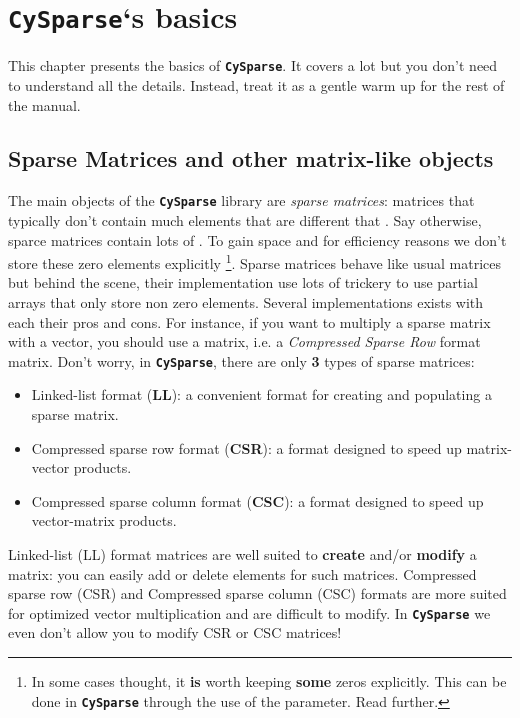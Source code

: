 \documentclass[letterpaper,10pt,english]{sphinxmanual}
\begin{document}
\chapter{\textbf{\texttt{CySparse}}`s basics}
\label{cysparse_basics:cysparse-s-basics}\label{cysparse_basics:cysparse-basics}\label{cysparse_basics::doc}
This chapter presents the basics of \textbf{\texttt{CySparse}}. It covers a lot but you don't need to understand all the details. Instead, treat it as a gentle warm up for the rest of the manual.


\section{Sparse Matrices and other matrix-like objects}
\label{cysparse_basics:sparse-matrices-and-other-matrix-like-objects}
The main objects of the \textbf{\texttt{CySparse}} library are \emph{sparse matrices}: matrices that typically don't contain much elements that are different that . Say otherwise, sparce matrices contain lots of .
To gain space and for efficiency reasons we don't store these zero elements explicitly \footnote{
In some cases thought, it \textbf{is} worth keeping \textbf{some} zeros explicitly. This can be done in \textbf{\texttt{CySparse}} through the use of the  parameter. Read further.
}. Sparse matrices behave like usual matrices but behind the scene, their implementation use lots of trickery to use
partial arrays that only store non zero elements. Several implementations exists with each their pros and cons. For instance, if you want to multiply a sparse matrix with a vector, you should use a  matrix,
i.e. a  \emph{Compressed Sparse Row} format matrix. Don't worry, in \textbf{\texttt{CySparse}}, there are only \textbf{3} types of sparse matrices:
\begin{itemize}
\item {} 
Linked-list format (\textbf{LL}): a convenient format for creating and populating a sparse matrix.

\item {} 
Compressed sparse row format (\textbf{CSR}): a format designed to speed up matrix-vector products.

\item {} 
Compressed sparse column format (\textbf{CSC}): a format designed to speed up vector-matrix products.

\end{itemize}

Linked-list (LL) format matrices are well suited to \textbf{create} and/or \textbf{modify} a matrix: you can easily add or delete elements for such matrices. Compressed sparse row (CSR) and Compressed sparse column (CSC) formats
are more suited for optimized vector multiplication and are difficult to modify. In \textbf{\texttt{CySparse}} we even don't allow you to modify CSR or CSC matrices!
\end{document}
